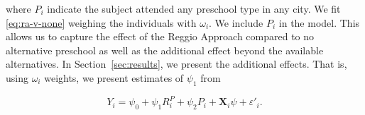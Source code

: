 \noindent where $P_i$ indicate the subject attended any preschool type in any city. We fit \eqref{eq:ra-v-none} weighing the individuals with $\omega_i$. We include $P_i$ in the model. This allows us to capture the effect of the Reggio Approach compared to no alternative preschool as well as the additional effect beyond the available alternatives. In Section~\ref{sec:results}, we present the additional effects. That is, using $\hat{\omega}_i$ weights, we present estimates of $\psi_1$ from

\begin{equation}
	Y_i = \psi_0 + \psi_1 R_i^{P} + \psi_2 P_i + \bm{X}_i \psi + \varepsilon'_i.
\end{equation}


